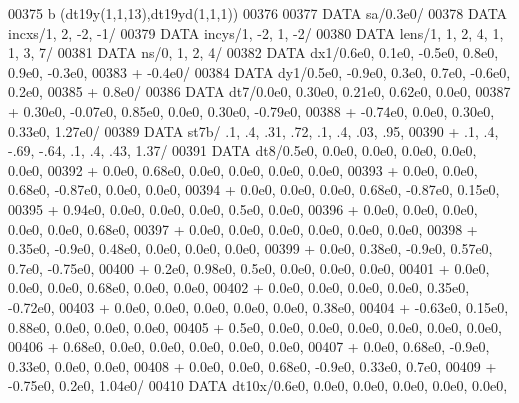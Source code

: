\begin{DoxyCode}
00375      b   (dt19y(1,1,13),dt19yd(1,1,1))
00376 
00377       \textcolor{keyword}{DATA}              sa/0.3e0/
00378       \textcolor{keyword}{DATA}              incxs/1, 2, -2, -1/
00379       \textcolor{keyword}{DATA}              incys/1, -2, 1, -2/
00380       \textcolor{keyword}{DATA}              lens/1, 1, 2, 4, 1, 1, 3, 7/
00381       \textcolor{keyword}{DATA}              ns/0, 1, 2, 4/
00382       \textcolor{keyword}{DATA}              dx1/0.6e0, 0.1e0, -0.5e0, 0.8e0, 0.9e0, -0.3e0,
00383      +                  -0.4e0/
00384       \textcolor{keyword}{DATA}              dy1/0.5e0, -0.9e0, 0.3e0, 0.7e0, -0.6e0, 0.2e0,
00385      +                  0.8e0/
00386       \textcolor{keyword}{DATA}              dt7/0.0e0, 0.30e0, 0.21e0, 0.62e0, 0.0e0,
00387      +                  0.30e0, -0.07e0, 0.85e0, 0.0e0, 0.30e0, -0.79e0,
00388      +                  -0.74e0, 0.0e0, 0.30e0, 0.33e0, 1.27e0/
00389       \textcolor{keyword}{DATA}              st7b/ .1, .4, .31, .72,     .1, .4, .03, .95,
00390      +                  .1, .4, -.69, -.64,   .1, .4, .43, 1.37/
00391       \textcolor{keyword}{DATA}              dt8/0.5e0, 0.0e0, 0.0e0, 0.0e0, 0.0e0, 0.0e0,
00392      +                  0.0e0, 0.68e0, 0.0e0, 0.0e0, 0.0e0, 0.0e0,
00393      +                  0.0e0, 0.0e0, 0.68e0, -0.87e0, 0.0e0, 0.0e0,
00394      +                  0.0e0, 0.0e0, 0.0e0, 0.68e0, -0.87e0, 0.15e0,
00395      +                  0.94e0, 0.0e0, 0.0e0, 0.0e0, 0.5e0, 0.0e0,
00396      +                  0.0e0, 0.0e0, 0.0e0, 0.0e0, 0.0e0, 0.68e0,
00397      +                  0.0e0, 0.0e0, 0.0e0, 0.0e0, 0.0e0, 0.0e0,
00398      +                  0.35e0, -0.9e0, 0.48e0, 0.0e0, 0.0e0, 0.0e0,
00399      +                  0.0e0, 0.38e0, -0.9e0, 0.57e0, 0.7e0, -0.75e0,
00400      +                  0.2e0, 0.98e0, 0.5e0, 0.0e0, 0.0e0, 0.0e0,
00401      +                  0.0e0, 0.0e0, 0.0e0, 0.68e0, 0.0e0, 0.0e0,
00402      +                  0.0e0, 0.0e0, 0.0e0, 0.0e0, 0.35e0, -0.72e0,
00403      +                  0.0e0, 0.0e0, 0.0e0, 0.0e0, 0.0e0, 0.38e0,
00404      +                  -0.63e0, 0.15e0, 0.88e0, 0.0e0, 0.0e0, 0.0e0,
00405      +                  0.5e0, 0.0e0, 0.0e0, 0.0e0, 0.0e0, 0.0e0, 0.0e0,
00406      +                  0.68e0, 0.0e0, 0.0e0, 0.0e0, 0.0e0, 0.0e0,
00407      +                  0.0e0, 0.68e0, -0.9e0, 0.33e0, 0.0e0, 0.0e0,
00408      +                  0.0e0, 0.0e0, 0.68e0, -0.9e0, 0.33e0, 0.7e0,
00409      +                  -0.75e0, 0.2e0, 1.04e0/
00410       \textcolor{keyword}{DATA}              dt10x/0.6e0, 0.0e0, 0.0e0, 0.0e0, 0.0e0, 0.0e0,

\end{DoxyCode}
